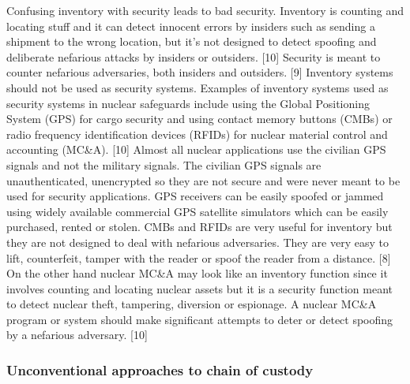 \documentclass[twocolumn,a4paper]{article}
\begin{document}
Confusing inventory with security leads to bad security. Inventory is counting and locating stuff and it 
can detect innocent errors by insiders such as sending a shipment to the wrong location, but it’s not 
designed to detect spoofing and deliberate nefarious attacks by insiders or outsiders. [10] Security is 
meant to counter nefarious adversaries, both insiders and outsiders. [9] Inventory systems should not be 
used as security systems. Examples of inventory systems used as security systems in nuclear safeguards 
include using the Global Positioning System (GPS) for cargo security and using contact memory buttons 
(CMBs) or radio frequency identification devices (RFIDs) for nuclear material control and accounting 
(MC\&A). [10] Almost all nuclear applications use the civilian GPS signals and not the military signals. 
The civilian GPS signals are unauthenticated, unencrypted so they are not secure and were never meant to 
be used for security applications. GPS receivers can be easily spoofed or jammed using widely available 
commercial GPS satellite simulators which can be easily purchased, rented or stolen. CMBs and RFIDs are 
very useful for inventory but they are not designed to deal with nefarious adversaries. They are very 
easy to lift, counterfeit, tamper with the reader or spoof the reader from a distance. [8] On the other 
hand nuclear MC\&A may look like an inventory function since it involves counting and locating nuclear 
assets but it is a security function meant to detect nuclear theft, tampering, diversion or espionage. 
A nuclear MC\&A program or system should make significant attempts to deter or detect spoofing by a 
nefarious adversary. [10]

\subsubsection{Unconventional approaches to chain of custody}
\end{document}
